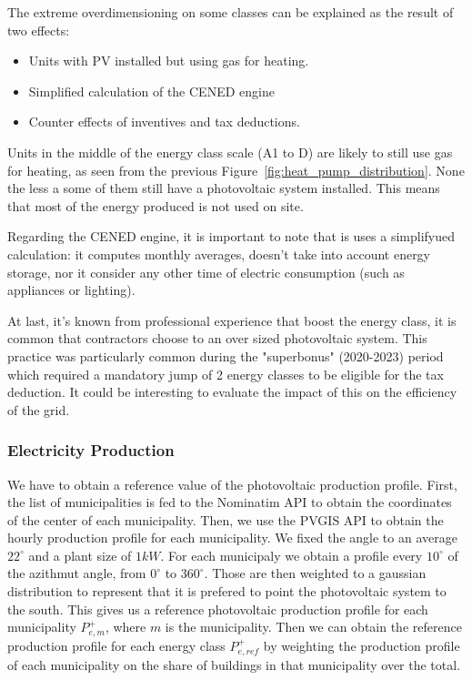 The extreme overdimensioning on some classes can be explained as the result of two effects:
\begin{itemize}
    \item Units with PV installed but using gas for heating.
    \item Simplified calculation of the CENED engine
    \item Counter effects of inventives and tax deductions.
\end{itemize}

Units in the middle of the energy class scale (A1 to D) are likely to still use gas for heating, as seen from the previous Figure~\ref{fig:heat_pump_distribution}.
None the less a some of them still have a photovoltaic system installed. This means that most of the energy produced is not used on site.

Regarding the CENED engine, it is important to note that is uses a simplifyued calculation: it computes monthly averages, doesn't take into account energy storage,
nor it consider any other time of electric consumption (such as appliances or lighting).

At last, it's known from professional experience that boost the energy class,
it is common that contractors choose to an over sized photovoltaic system. 
This practice was particularly common during the "superbonus" (2020-2023) period which required a mandatory jump of 2 energy classes to be eligible for the tax deduction.
It could be interesting to evaluate the impact of this on the efficiency of the grid.

\subsubsection{Electricity Production}
We have to obtain a reference value of the photovoltaic production profile.
First, the list of municipalities is fed to the Nominatim API \cite{Nominatim} to obtain the coordinates of the center of each municipality.
Then, we use the PVGIS API \cite{PVGIS} to obtain the hourly production profile for each municipality.
We fixed the angle to an average $22^\circ$ and a plant size of $1kW$.
For each municipaly we obtain a profile every $10^\circ$ of the azithmut angle, from $0^\circ$ to $360^\circ$. 
Those are then weighted to a gaussian distribution to represent that it is prefered to point the photovoltaic system to the south.
This gives us a reference photovoltaic production profile for each municipality $P_{e,m}^+$, where $m$ is the municipality.
Then we can obtain the reference production profile for each energy class $P_{e,ref}^+$ by weighting the production profile of each municipality on the share of buildings in that municipality over the total.

